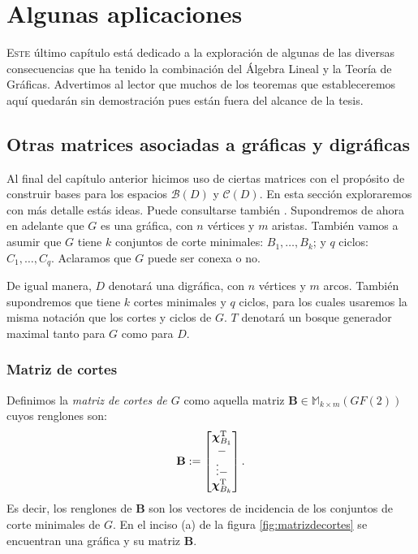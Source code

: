 \chapter{Algunas aplicaciones}

\lettrine [lines=5] {\initfamily \selectfont E} {ste} último capítulo está dedicado a la exploración de algunas de las diversas consecuencias que ha tenido la combinación del Álgebra Lineal y la Teoría de Gráficas. Advertimos al lector que muchos de los teoremas que estableceremos aquí quedarán sin demostración pues están fuera del alcance de la tesis. 


\section{Otras matrices asociadas a gráficas y digráficas}
Al final del capítulo anterior hicimos uso de ciertas matrices con el propósito de construir bases para los espacios $\mathcal{B}(D)$ y $\mathcal{C}(D)$. En esta sección exploraremos con más detalle estás ideas. Puede consultarse también \cite{Deo,Seshu,Gross}. Supondremos de ahora en adelante que $G$ es una gráfica, con $n$ vértices y $m$ aristas. También vamos a asumir que $G$ tiene $k$ conjuntos de corte minimales: $B_{1}, \ldots, B_{k}$; y $q$ ciclos: $C_{1},\ldots, C_{q}$. Aclaramos que $G$ puede ser conexa o no. 

De igual manera, $D$ denotará una digráfica, con $n$ vértices y $m$ arcos. También supondremos que tiene $k$ cortes minimales y $q$ ciclos, para los cuales usaremos la misma notación que los cortes y ciclos de $G$. $T$ denotará un bosque generador maximal tanto para $G$ como para $D$.

\subsection{Matriz de cortes}
 Definimos la \textit{matriz de cortes de $G$} como aquella matriz $\mathbf{B} \in \mathbb{M}_{k \times m}(GF(2))$ cuyos renglones son:
$$
\mathbf{B}:= \begin{bmatrix} 
\boldsymbol{\chi}_{B_{1}}^{\textnormal{T}} \\
\-- \\
\vdots
\-- \\
\boldsymbol{\chi}_{B_{k}}^{\textnormal{T}}
\end{bmatrix}.
$$
 Es decir, los renglones de $\mathbf{B}$ son los vectores de incidencia de los conjuntos de corte minimales de $G$. En el inciso (a) de la figura \ref{fig:matrizdecortes} se encuentran una gráfica y su matriz $\mathbf{B}$.
 
